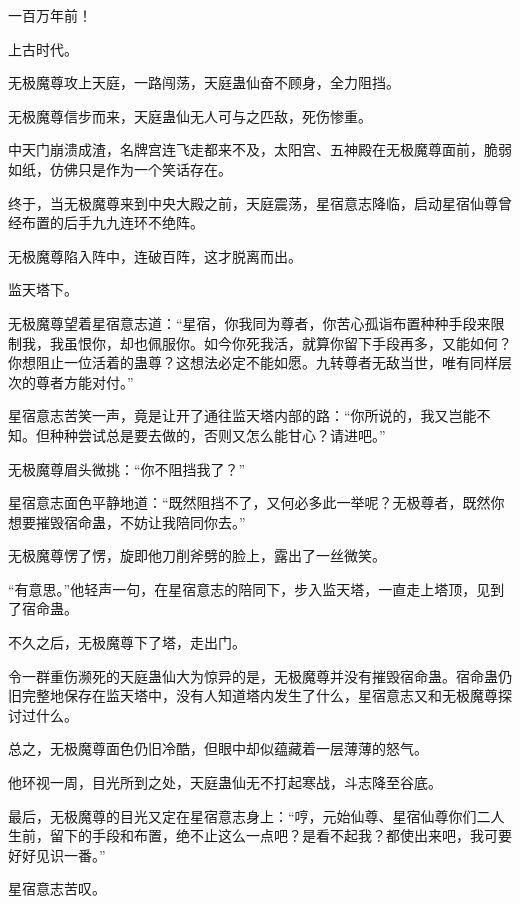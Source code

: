 
\begin{this_body}



一百万年前！

上古时代。

无极魔尊攻上天庭，一路闯荡，天庭蛊仙奋不顾身，全力阻挡。

无极魔尊信步而来，天庭蛊仙无人可与之匹敌，死伤惨重。

中天门崩溃成渣，名牌宫连飞走都来不及，太阳宫、五神殿在无极魔尊面前，脆弱如纸，仿佛只是作为一个笑话存在。

终于，当无极魔尊来到中央大殿之前，天庭震荡，星宿意志降临，启动星宿仙尊曾经布置的后手九九连环不绝阵。

无极魔尊陷入阵中，连破百阵，这才脱离而出。

监天塔下。

无极魔尊望着星宿意志道：“星宿，你我同为尊者，你苦心孤诣布置种种手段来限制我，我虽恨你，却也佩服你。如今你死我活，就算你留下手段再多，又能如何？你想阻止一位活着的蛊尊？这想法必定不能如愿。九转尊者无敌当世，唯有同样层次的尊者方能对付。”

星宿意志苦笑一声，竟是让开了通往监天塔内部的路：“你所说的，我又岂能不知。但种种尝试总是要去做的，否则又怎么能甘心？请进吧。”

无极魔尊眉头微挑：“你不阻挡我了？”

星宿意志面色平静地道：“既然阻挡不了，又何必多此一举呢？无极尊者，既然你想要摧毁宿命蛊，不妨让我陪同你去。”

无极魔尊愣了愣，旋即他刀削斧劈的脸上，露出了一丝微笑。

“有意思。”他轻声一句，在星宿意志的陪同下，步入监天塔，一直走上塔顶，见到了宿命蛊。

不久之后，无极魔尊下了塔，走出门。

令一群重伤濒死的天庭蛊仙大为惊异的是，无极魔尊并没有摧毁宿命蛊。宿命蛊仍旧完整地保存在监天塔中，没有人知道塔内发生了什么，星宿意志又和无极魔尊探讨过什么。

总之，无极魔尊面色仍旧冷酷，但眼中却似蕴藏着一层薄薄的怒气。

他环视一周，目光所到之处，天庭蛊仙无不打起寒战，斗志降至谷底。

最后，无极魔尊的目光又定在星宿意志身上：“哼，元始仙尊、星宿仙尊你们二人生前，留下的手段和布置，绝不止这么一点吧？是看不起我？都使出来吧，我可要好好见识一番。”

星宿意志苦叹。


\end{this_body}
